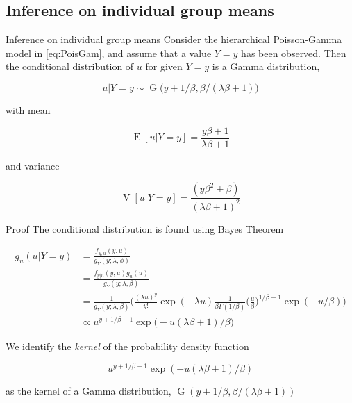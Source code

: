\documentclass[aspectratio=169]{beamer}
\DeclareMathOperator{\E}{E}
\DeclareMathOperator{\V}{V}
\DeclareMathOperator{\G}{G}
\begin{document}
\hypertarget{inference-on-individual-group-means}{%
\subsection{Inference on individual group
means}\label{inference-on-individual-group-means}}

\begin{frame}{Inference on individual group means}
Consider the hierarchical Poisson-Gamma model in \eqref{eq:PoisGam}, and
assume that a value \(Y=y\) has been observed. Then the conditional
distribution of \(u\) for given \(Y=y\) is a Gamma distribution,

\begin{equation}
  u|Y=y\sim \G\big(y+1/\beta,\beta/(\lambda \beta+1)\big)
\end{equation}

with mean

\begin{equation}
  \E[u|Y=y]=\frac{y\beta+1}{\lambda\beta+1}
\end{equation}

and variance

\begin{equation}
  \V[u|Y=y]=\frac{(y \beta^2+\beta)}{(\lambda \beta  + 1)^2}
\end{equation}
\end{frame}

\begin{frame}{Proof}
\protect\hypertarget{proof-3}{}
The conditional distribution is found using Bayes Theorem

\begin{equation}
  \begin{aligned}
    g_{u}(u|Y=y)&=\frac{f_{y,u}(y,u)}{g_Y(y;\lambda, \phi)} \\
    &=\frac{f_{y|u}(y;u)g_{u}(u)}{g_{Y}(y;\lambda,\beta)} \\
    &=\frac{1}{g_{Y}(y;\lambda,\beta)}\bigg(\frac{(\lambda u)^y}{y!} \exp (-\lambda u) \frac{1}{\beta \Gamma(1/\beta)} \bigg(\frac{u}{\beta}\bigg)^{1/\beta-1} \exp (-u/\beta)\bigg) \\
    &\propto u^{y+1/\beta-1} \exp \big(- u(\lambda\beta+1)/\beta\big)
  \end{aligned}
\end{equation}

We identify the \emph{kernel} of the probability density function

\begin{equation}
  u^{y+1/\beta-1} \exp (- u(\lambda\beta+1)/\beta)
\end{equation}

as the kernel of a Gamma distribution,
\(\G(y+1/\beta,\beta/(\lambda\beta+1))\)
\end{frame}
\end{document}
